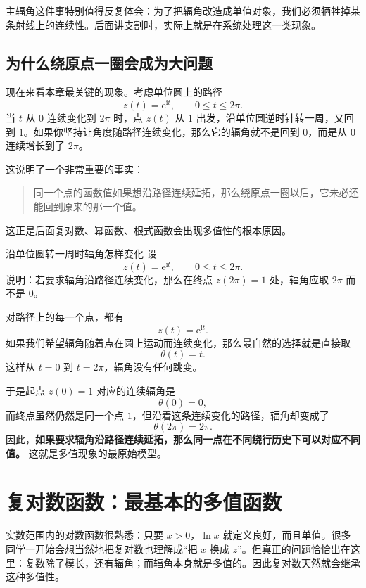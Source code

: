 \begin{jinshi}[单值和连续往往不能同时保住]
主辐角这件事特别值得反复体会：为了把辐角改造成单值对象，我们必须牺牲掉某条射线上的连续性。后面讲支割时，实际上就是在系统处理这一类现象。
\end{jinshi}

\subsection{为什么绕原点一圈会成为大问题}

现在来看本章最关键的现象。考虑单位圆上的路径
\[
    z(t)=\mathrm{e}^{\mathrm{i}t},\qquad 0\le t\le 2\pi.
\]
当 $t$ 从 $0$ 连续变化到 $2\pi$ 时，点 $z(t)$ 从 $1$ 出发，沿单位圆逆时针转一周，又回到 $1$。如果你坚持让角度随路径连续变化，那么它的辐角就不是回到 $0$，而是从 $0$ 连续增长到了 $2\pi$。

这说明了一个非常重要的事实：
\begin{quote}
同一个点的函数值如果想沿路径连续延拓，那么绕原点一圈以后，它未必还能回到原来的那一个值。
\end{quote}

这正是后面复对数、幂函数、根式函数会出现多值性的根本原因。

\begin{lizi}{沿单位圆转一周时辐角怎样变化}{}
设
\[
    z(t)=\mathrm{e}^{\mathrm{i}t},\qquad 0\le t\le 2\pi.
\]
说明：若要求辐角沿路径连续变化，那么在终点 $z(2\pi)=1$ 处，辐角应取 $2\pi$ 而不是 $0$。

\begin{jie}
对路径上的每一个点，都有
\[
    z(t)=\mathrm{e}^{\mathrm{i}t}.
\]
如果我们希望辐角随着点在圆上运动而连续变化，那么最自然的选择就是直接取
\[
    \theta(t)=t.
\]
这样从 $t=0$ 到 $t=2\pi$，辐角没有任何跳变。

于是起点 $z(0)=1$ 对应的连续辐角是
\[
    \theta(0)=0,
\]
而终点虽然仍然是同一个点 $1$，但沿着这条连续变化的路径，辐角却变成了
\[
    \theta(2\pi)=2\pi.
\]
因此，\textbf{如果要求辐角沿路径连续延拓，那么同一点在不同绕行历史下可以对应不同值。} 这就是多值现象的最原始模型。
\end{jie}
\end{lizi}

\section{复对数函数：最基本的多值函数}

\begin{wulibj}[为什么复对数是本章主角]
实数范围内的对数函数很熟悉：只要 $x>0$，$\ln x$ 就定义良好，而且单值。很多同学一开始会想当然地把复对数也理解成``把 $x$ 换成 $z$''。但真正的问题恰恰出在这里：复数除了模长，还有辐角；而辐角本身就是多值的。因此复对数天然就会继承这种多值性。
\end{wulibj}

